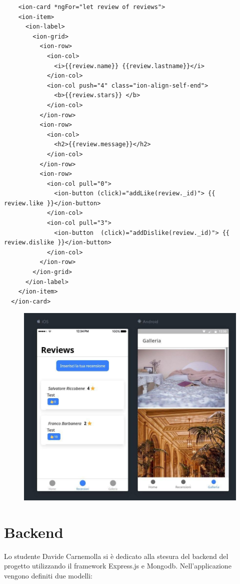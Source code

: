 \documentclass{article}[12pt]
\begin{document}
{\begin{lstlisting}
	<ion-card *ngFor="let review of reviews">
    <ion-item>
      <ion-label>
        <ion-grid>
          <ion-row>
            <ion-col>
              <i>{{review.name}} {{review.lastname}}</i>
            </ion-col>
            <ion-col push="4" class="ion-align-self-end">
              <b>{{review.stars}} </b>
            </ion-col>
          </ion-row>
          <ion-row>
            <ion-col>
              <h2>{{review.message}}</h2>
            </ion-col>
          </ion-row>
          <ion-row>
            <ion-col pull="0">
              <ion-button (click)="addLike(review._id)"> {{ review.like }}</ion-button>
            </ion-col>
            <ion-col pull="3">
              <ion-button  (click)="addDislike(review._id)"> {{ review.dislike }}</ion-button>
            </ion-col>
          </ion-row>
        </ion-grid>
      </ion-label>
    </ion-item>
  </ion-card>
\end{lstlisting}

\begin{figure}
	\includegraphics[width=\columnwidth]{img/screenapp.jpg}
\end{figure}\break
 
 \section{Backend}
 
 Lo studente Davide Carnemolla si è dedicato alla stesura del backend del progetto utilizzando il framework Express.js e Mongodb. Nell'applicazione vengono definiti due modelli:
 
}
\end{document}
